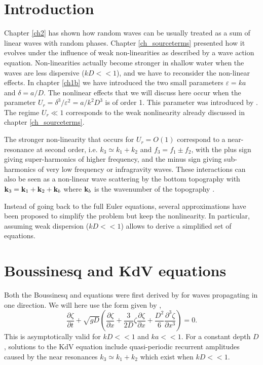 \section{Introduction}
Chapter \ref{ch2} has shown how random waves can be usually treated as a 
sum of linear waves with random phases. Chapter \ref{ch_sourceterms} presented how it evolves under the influence of weak non-linearities 
as described by a wave action equation. Non-linearities actually become stronger in shallow water when the waves are less dispersive ($kD << 1$), 
and we have to reconsider the non-linear effects. In chapter \ref{ch1b} we have introduced the two small parameters 
$\varepsilon=ka$ and $\delta=a/D$. The nonlinear effects that we will discuss here occur when the parameter $U_r = \delta^3/\varepsilon^2= a/k^2 D^3$ is 
of order 1. This parameter was introduced by \cite{Ursell1953}. The regime $U_r  \ll 1$ corresponds to the weak nonlinearity already 
discussed in chapter  \ref{ch_sourceterms}. 

The stronger non-linearity that occurs for $U_r=O(1)$ correspond to a near-resonance at second order, i.e. $k_3 \simeq k_1 + k_2$ and 
 $f_3 = f_1 \pm f_2$, with the plus sign giving super-harmonics of higher frequency, and the minus sign giving sub-harmonics of very low frequency 
 or infragravity waves. These interactions can also be seen as a non-linear wave scattering by the bottom topography with $\mathbf{k}_3 =  \mathbf{k}_1 + \mathbf{k}_2 + \mathbf{k}_b$ 
 where $\mathbf{k}_b$ is the wavenumber of the topography \citep{Liu&Yue1998,Groeneweg&al.2015}. 

Instead of going back to the full Euler equations, several approximations have been proposed to simplify the problem but keep the nonlinearity. 
In  particular, assuming weak dispersion ($kD << 1$) allows to derive a simplified set of equations. 

\section{Boussinesq and KdV equations}
Both the Boussinesq and \citet[][KdV for short]{Korteweg&deVries1895} equations were first derived by \cite{Boussinesq1872} for waves propagating in one direction. We will 
here use the form given by \cite{Peregrine1967}, 
\begin{equation}
    \frac{\partial \zeta}{\partial t}+\sqrt{gD} \left( \frac{\partial \zeta}{\partial x}+\frac{3}{2D} \zeta \frac{\partial \zeta}{\partial x}
    +\frac{D^2}{6} \frac{\partial^3 \zeta}{\partial x^3} \right)=0. \label{eq:KdV}
\end{equation}
This is asymptotically valid for $kD << 1$ and $ka << 1$. For a constant depth $D$, 
solutions to the KdV equation include quasi-periodic recurrent amplitudes 
\citep{Fermi&al.1955} caused by the near resonances $k_3 \simeq k_1 + k_2$  which exist when $kD<< 1$. 

